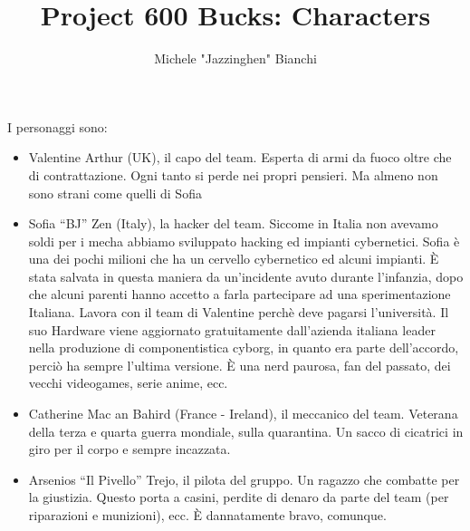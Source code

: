 \documentclass[9pt,a4paper,cleardoubleempty]{scrbook}
\author{Michele "Jazzinghen" Bianchi}
\title{Project 600 Bucks: Characters}
\begin{document}
    
  I personaggi sono:
  \begin{itemize}
    \item Valentine Arthur (UK), il capo del team. Esperta di armi da fuoco
      oltre che di contrattazione. Ogni tanto si perde nei propri pensieri.
      Ma almeno non sono strani come quelli di Sofia
    \item Sofia ``BJ'' Zen (Italy), la hacker del team. Siccome in Italia
      non avevamo soldi per i mecha abbiamo sviluppato hacking ed impianti
      cybernetici. Sofia è una dei pochi milioni che ha un cervello
      cybernetico ed alcuni impianti. È stata salvata in questa maniera da
      un'incidente avuto durante l'infanzia, dopo che alcuni parenti hanno
      accetto a farla partecipare ad una sperimentazione Italiana. Lavora
      con il team di Valentine perchè deve pagarsi l'università. Il suo
      Hardware viene aggiornato gratuitamente dall'azienda italiana leader nella
      produzione di componentistica cyborg, in quanto era parte
      dell'accordo, perciò ha sempre l'ultima versione. È una nerd paurosa,
      fan del passato, dei vecchi videogames, serie anime, ecc.
    \item Catherine Mac an Bahird (France - Ireland), il meccanico del
      team. Veterana della terza e quarta guerra mondiale, sulla
      quarantina. Un sacco di cicatrici in giro per il corpo e sempre
      incazzata. 
    \item Arsenios ``Il Pivello'' Trejo, il pilota del gruppo. Un ragazzo
      che combatte per la giustizia. Questo porta a casini, perdite di
      denaro da parte del team (per riparazioni e munizioni), ecc. È
      dannatamente bravo, comunque.
  \end{itemize}
\end{document}
